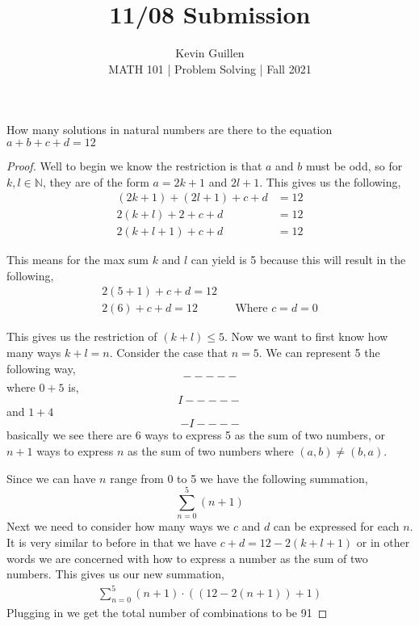 \documentclass[11pt]{article}
\newenvironment{problem}[2][Problem\!]{\begin{trivlist}
\item[\hskip \labelsep {\bfseries #1}\hskip \labelsep {\bfseries #2}]}{\end{trivlist}}
\newcommand{\nn}{\mathbb N}   %
\renewcommand{\leq}{\leqslant}
\begin{document}
 
\title{11/08 Submission}
\author{Kevin Guillen\\[0.5em]
MATH 101 | Problem Solving | Fall 2021}
\date{} 
\maketitle



\begin{tcolorbox}
    \begin{problem} {IC | 11/01 | 109.}
        How many solutions in natural numbers are there to the equation $a + b + c + d = 12$
    \end{problem}
\end{tcolorbox}
\begin{proof}
    Well to begin we know the restriction is that $a$ and $b$ must be odd, so for $k,l \in \nn$, they are of the form $a = 2k + 1$ and $2l + 1$. This gives us the following,
    \begin{align*}
        (2k +1) + (2l + 1) + c + d &= 12 \\
        2(k + l) + 2 + c + d &= 12 \\
        2(k + l + 1) + c + d &= 12
    \end{align*}

    This means for the max sum $k$ and $l$ can yield is 5 because this will result in the following,
    \begin{align*}
        2(5 + 1) + c + d = 12 \\
        2(6) + c + d = 12 && \text{Where } c=d=0
    \end{align*}
     
    This gives us the restriction of $(k + l) \leq 5$. Now we want to first know how many ways $k + l = n$. Consider the case that $n = 5$. We can represent 5 the following way,
    \[- - - - -\] where $0 + 5$ is, \[I - - - - -\] and $1 + 4$ \[- I - - - -\] basically we see there are $6$ ways to express 5 as the sum of two numbers, or $n + 1$ ways to express $n$ as the sum of two numbers where $(a,b) \neq (b, a)$.
    
    Since we can have $n$ range from 0 to 5 we have the following summation,
    \[\sum_{n = 0}^5 (n + 1)\]
    Next we need to consider how many ways we $c$ and $d$ can be expressed for each $n$. It is very similar to before in that we have $c + d = 12 - 2(k + l + 1)$ or in other words we are concerned with how to express a number as the sum of two numbers. This gives us our new summation,
    \begin{align*}
        \sum_{n = 0}^5 (n+1) \cdot ((12 - 2(n + 1)) + 1)
    \end{align*}
    Plugging in we get the total number of combinations to be 91

\end{proof}
\end{document}
